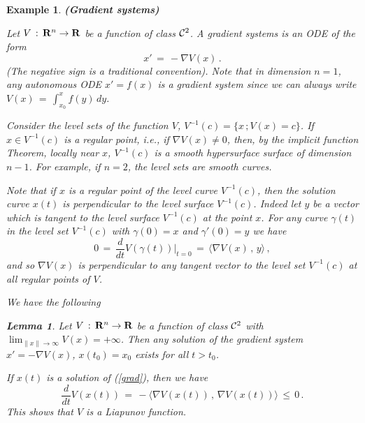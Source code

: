 \documentclass[12pt]{report}
\newcommand{\calC}{{\cal C}}
\newcommand{\bR}{{\bf R}}
\newtheorem{lemma}[theorem]{Lemma}
\newtheorem{example}[theorem]{Example}
\newcommand{\proof}{\noindent {\em Proof:~}}
\def\eqref#1{(\ref{#1})}
\def\qed{\hbox{\hskip 6pt\vrule width6pt height7pt depth1pt
    \hskip1pt}\bigskip}
\def\to{\rightarrow}
\begin{document}
\begin{example}{\bf (Gradient systems)}
{\rm 
Let $V\,:\, \bR^n \to \bR$ be a function of class 
$\calC^2$. A {\em gradient systems} is an ODE of the form 
\begin{equation}\label{grad0}
x'\,=\, - \nabla V(x) \,. 
\end{equation}
(The negative sign is a traditional convention).  
Note that in dimension $n=1$, any autonomous ODE $x'=f(x)$ is a gradient system
since we can always write $V(x) \,=\, \int_{x_0}^{x} f(y) \,dy$.    

Consider the level sets of the function $V$,  $V^{-1}(c)=\{x\,; V(x)=c\}$. 
If $x \in V^{-1}(c)$ is a {\em regular point}, i.e., if $\nabla V(x) \not=0$, 
then, by the implicit function Theorem, locally near $x$,  $V^{-1}(c)$ is a smooth 
hypersurface surface of dimension $n-1$.  For example, 
if $n=2$, the level sets are smooth curves. 

Note that  if $x$ is a regular point of the level curve $V^{-1}(c)$, then 
the solution curve $x(t)$  is perpendicular to the level surface $V^{-1}(c)$. 
Indeed let  $y$ be a vector which is tangent to the level surface $V^{-1}(c)$ at the 
point $x$. For any curve $\gamma(t)$ in the level set $V^{-1}(c)$  
with $\gamma(0)=x$ and $\gamma'(0)=y$ we have 
\begin{equation}
0\,=\, \frac{d}{dt} V(\gamma(t)) \vert_{t=0} \,=\, 
\langle \nabla V(x)\,,\, y \rangle \,,
\end{equation} 
and so $\nabla V(x)$ is perpendicular to any tangent vector to the level 
set $V^{-1}(c)$ at all regular points of $V$.  


We have the following
\begin{lemma}  Let $V\,:\, \bR^n \to \bR$ be a function of class 
$\calC^2$ with $\lim_{\|x\|\to \infty} V(x) = + \infty$.  
Then any solution of the gradient system $x'=-\nabla V(x)$, $x(t_0)=x_0$
exists for all $t>t_0$.  
\end{lemma}

\proof  If $x(t)$ is a solution of \eqref{grad}, then we have 
\begin{equation}
\frac{d}{dt} V( x(t))\,=\, - \langle \nabla V(x(t))\,,\, \nabla V(x(t))\rangle 
\, \le \, 0 \,.
\end{equation}
This shows that $V$ is a Liapunov function. \qed
}
\end{example}
\end{document}
